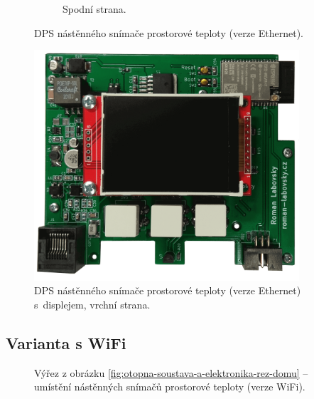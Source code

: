 \begin{figure}[H]
\begin{subfigure}{.5\textwidth}
  \caption{Spodní strana.}
  \label{fig:dps-nastenny-snimac-prostorove-teploty-ethernet-spodni-cast}
\end{subfigure}
\caption{DPS nástěnného snímače prostorové teploty (verze Ethernet).}
\label{fig:dps-nastenny-snimac-prostorove-teploty-ethernet}
\end{figure}


\begin{figure}[H]
    \centering
    \includegraphics[width=0.88\textwidth]{images/nastenny-snimac-prostorove-teploty-ethernet/dps-nastenny-snimac-prostorove-teploty-ethernet-vrchni-cast-displej.png}
    \caption{DPS nástěnného snímače prostorové teploty (verze Ethernet) s~displejem, vrchní strana.}
    \label{fig:dps-nastenny-snimac-prostorove-teploty-ethernet-vrchni-cast-displej}
\end{figure}



\subsection{Varianta s WiFi}
\label{sec:wifi-modul}


\begin{figure}[H]
   \centering
   \def\svgwidth{0.5\columnwidth}
   
    \caption[Výřez umístění nástěnných snímačů prostorové teploty (verze WiFi).]{Výřez z obrázku \ref{fig:otopna-soustava-a-elektronika-rez-domu} – umístění nástěnných snímačů prostorové teploty (verze WiFi).}
    \label{fig:vyrez-nastenny-snimac-prostorove-teploty-wifi}
\end{figure}

